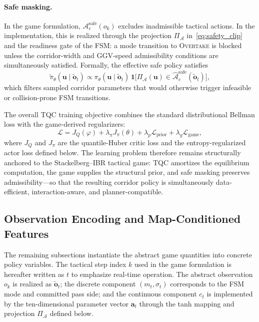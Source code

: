 \documentclass{iopjournal}
\begin{document}
\paragraph{Safe masking.}
In the game formulation, $\mathcal{A}_e^{\mathrm{safe}}(o_k)$ excludes
inadmissible tactical actions.  In the implementation, this is realized through
the projection $\Pi_{\mathcal{A}}$ in~\eqref{eq:safety_clip} and the
readiness gate of the FSM: a mode transition to \textsc{Overtake} is blocked
unless the corridor-width and GGV-speed admissibility conditions are
simultaneously satisfied.  Formally, the effective safe policy satisfies
\begin{equation}
\tilde\pi_\theta(\bm{u}\mid\widetilde{\bm{o}}_t)\propto
\pi_\theta(\bm{u}\mid\widetilde{\bm{o}}_t)\,
\mathbf{1}\!\bigl[\Pi_{\mathcal{A}}(\bm{u})\in
\widehat{\mathcal{A}}_e^{\mathrm{safe}}(\widetilde{\bm{o}}_t)\bigr],
\label{eq:safe_mask}
\end{equation}
which filters sampled corridor parameters that would otherwise trigger
infeasible or collision-prone FSM transitions.

The overall TQC training objective combines the standard distributional
Bellman loss with the game-derived regularizers:
\begin{equation}
\mathcal{L}=
J_Q(\varphi)
+\lambda_\pi J_\pi(\theta)
+\lambda_p\mathcal{L}_{\mathrm{prior}}
+\lambda_g\mathcal{L}_{\mathrm{game}},
\label{eq:total_loss}
\end{equation}
where $J_Q$ and $J_\pi$ are the quantile-Huber critic loss and the
entropy-regularized actor loss defined below.
The learning problem therefore remains structurally anchored to the
Stackelberg--IBR tactical game: TQC amortizes the equilibrium computation,
the game supplies the structural prior, and safe masking preserves
admissibility---so that the resulting corridor policy is simultaneously
data-efficient, interaction-aware, and planner-compatible.

\subsection{Observation Encoding and Map-Conditioned Features}
\label{subsec:obs_encoding}

The remaining subsections instantiate the abstract game quantities into
concrete policy variables.  The tactical step index $k$ used in the game
formulation is hereafter written as $t$ to emphasize real-time operation.
The abstract observation $o_k$ is realized as
$\widetilde{\bm{o}}_t$; the discrete component $(m_t,\sigma_t)$
corresponds to the FSM mode and committed pass side; and the continuous
component $c_t$ is implemented by the ten-dimensional parameter vector
$\bm{a}_t$ through the tanh mapping and projection
$\Pi_{\mathcal{A}}$ defined below.
\end{document}
